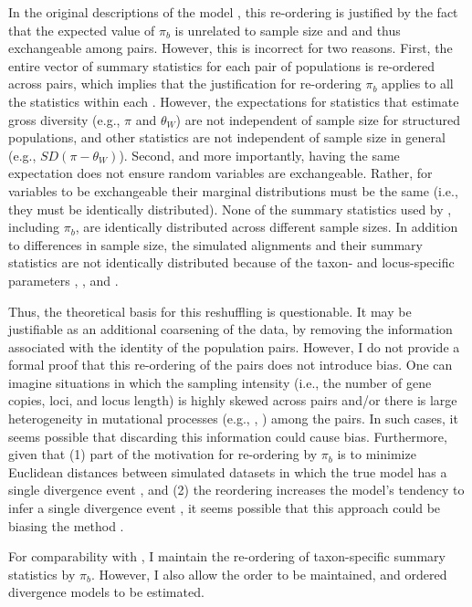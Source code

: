 In the original descriptions of the \msb model \cite{Hickerson2006,Huang2011},
this re-ordering is justified by the fact that the expected value of $\pi_b$ is
unrelated to sample size  and  and thus
exchangeable among pairs.
However, this is incorrect for two reasons.
First, the entire vector of summary statistics \alignmentSS{}{} for each pair
of populations is re-ordered across pairs, which implies that the justification
for re-ordering $\pi_b$ applies to all the statistics within each
\alignmentSS{}{}.
However, the expectations for statistics that estimate gross diversity (e.g.,
$\pi$ and $\theta_W$) are not independent of sample size for structured
populations, and other statistics are not independent of sample size in general
(e.g., $SD(\pi-\theta_W)$).
Second, and more importantly, having the same expectation does not ensure
random variables are exchangeable.
Rather, for variables to be exchangeable their marginal distributions must be
the same (i.e., they must be identically distributed).
None of the summary statistics used by \msb, including $\pi_b$, are identically
distributed across different sample sizes.
In addition to differences in sample size, the simulated alignments and their
summary statistics are not identically distributed because of the taxon- and
locus-specific parameters \hkyModel{}{}, \mutationRateScalarConstant{}{}, and
\ploidyScalar{}{}.

Thus, the theoretical basis for this reshuffling is questionable.
It may be justifiable as an additional coarsening of the data,
by removing the information associated with the identity of the
population pairs.
However, I do not provide a formal proof that this re-ordering of the pairs
does not introduce bias.
One can imagine situations in which the sampling intensity (i.e., the
number of gene copies, loci, and locus length) is highly skewed across
pairs and/or there is large heterogeneity in mutational processes
(e.g., \hkyModel{}{}, \mutationRateScalarConstant{}{}) among the pairs.
In such cases, it seems possible that discarding this information could
cause bias.
Furthermore, given that (1) part of the motivation for re-ordering by $\pi_b$
is to minimize Euclidean distances between simulated datasets in which the true
model has a single divergence event \cite{Huang2011}, and (2) the reordering
increases the model's tendency to infer a single divergence event
\cite{Huang2011}, it seems possible that this approach could be biasing the
method \cite{Oaks2012}.

For comparability with \msb, I maintain the re-ordering of taxon-specific
summary statistics by $\pi_b$.  However, I also allow the order to be
maintained, and ordered divergence models to be estimated.

